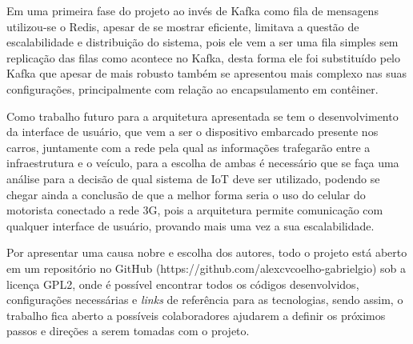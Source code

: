 Em uma primeira fase do projeto ao invés de Kafka como fila de mensagens utilizou-se o Redis, apesar de se mostrar eficiente, limitava a questão de escalabilidade e distribuição do sistema, pois ele vem a ser uma fila simples sem replicação das filas como acontece no Kafka, desta forma ele foi substituído pelo Kafka que apesar de mais robusto também se apresentou mais complexo nas suas configurações, principalmente com relação ao encapsulamento em contêiner.

Como trabalho futuro para a arquitetura apresentada se tem o desenvolvimento da interface de usuário, que vem a ser o dispositivo embarcado presente nos carros, juntamente com a rede pela qual as informações trafegarão entre a infraestrutura e o veículo, para a escolha de ambas é necessário que se faça uma análise para a decisão de qual sistema de IoT deve ser utilizado, podendo se chegar ainda a conclusão de que a melhor forma seria o uso do celular do motorista conectado a rede 3G, pois a arquitetura permite comunicação com qualquer interface de usuário, provando mais uma vez a sua escalabilidade. 

Por apresentar uma causa nobre e escolha dos autores, todo o projeto está aberto em um repositório no GitHub (https://github.com/alexcvcoelho-gabrielgio) sob a licença GPL2, onde é possível encontrar todos os códigos desenvolvidos, configurações necessárias e \textit{links} de referência para as tecnologias, sendo assim, o trabalho fica aberto a possíveis colaboradores ajudarem a definir os próximos passos e direções a serem tomadas com o projeto.

